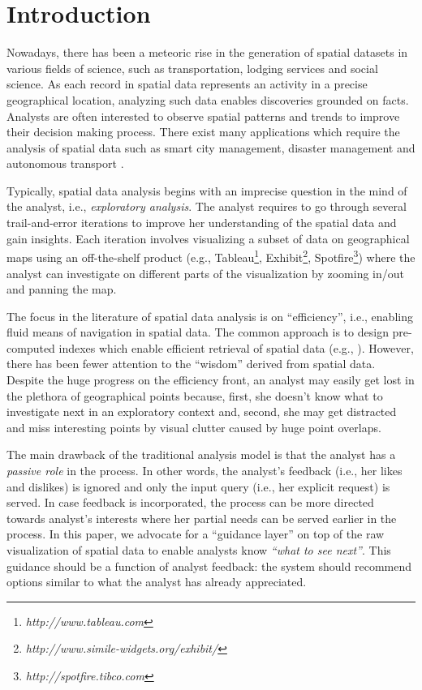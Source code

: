 \documentclass{vldb}
\begin{document}
\section{Introduction}
Nowadays, there has been a meteoric rise in the generation of spatial datasets in various fields of science, such as transportation, lodging services and social science. As each record in spatial data represents an activity in a precise geographical location, analyzing such data enables discoveries grounded on facts. Analysts are often interested to observe spatial patterns and trends to improve their decision making process. There exist many applications which require the analysis of spatial data such as smart city management, disaster management and autonomous transport \cite{RoddickEHPS04,Telang:2012}.

\vspace{2pt}
Typically, spatial data analysis begins with an imprecise question in the mind of the analyst, i.e., {\em exploratory analysis}. The analyst requires to go through several trail-and-error iterations to improve her understanding of the spatial data and gain insights. Each iteration involves visualizing a subset of data on geographical maps using an  off-the-shelf product (e.g., Tableau\footnote{\it http://www.tableau.com}, Exhibit\footnote{\it http://www.simile-widgets.org/exhibit/}, Spotfire\footnote{\it http://spotfire.tibco.com}) where the analyst can investigate on different parts of the visualization by zooming in/out and panning the map. 

\vspace{3pt}
The focus in the literature of spatial data analysis is on ``efficiency'', i.e., enabling fluid means of navigation in spatial data. The common approach is to design pre-computed indexes which enable efficient retrieval of spatial data (e.g., \cite{lins2013nanocubes}). However, there has been fewer attention to the ``wisdom'' derived from spatial data. Despite the huge progress on the efficiency front, an analyst may easily get lost in the plethora of geographical points because, first, she doesn't know what to investigate next in an exploratory context and, second, she may get distracted and miss interesting points by visual clutter caused by huge point overlaps.

\vspace{2pt}
The main drawback of the traditional analysis model is that the analyst has a {\em passive role} in the process. In other words, the analyst's feedback (i.e., her likes and dislikes) is ignored and only the input query (i.e., her explicit request) is served. In case feedback is incorporated, the process can be more directed towards analyst's interests where her partial needs can be served earlier in the process. In this paper, we advocate for a ``guidance layer'' on top of the raw visualization of spatial data to enable analysts know {\em ``what to see next''}. This guidance should be a function of analyst feedback: the system should recommend options similar to what the analyst has already appreciated. 
\end{document}
